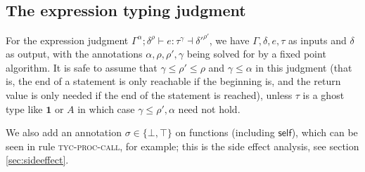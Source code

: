 \documentclass[acmsmall,nonacm]{acmart}
\newcommand{\proves}{\vdash}
\newcommand{\makes}{\dashv}
\begin{document}
\subsection{The expression typing judgment}

For the expression judgment $\Gamma^\alpha;\delta^{\rho} \proves e:\tau^\gamma\makes{\delta'}^{\rho'}$, we have $\Gamma,\delta,e,\tau$ as inputs and $\delta$ as output, with the annotations $\alpha,\rho,\rho',\gamma$ being solved for by a fixed point algorithm. It is safe to assume that $\gamma\le \rho'\le \rho$ and $\gamma\le \alpha$ in this judgment (that is, the end of a statement is only reachable if the beginning is, and the return value is only needed if the end of the statement is reached), unless $\tau$ is a ghost type like $\mathbf{1}$ or $A$ in which case $\gamma\le \rho',\alpha$ need not hold.

We also add an annotation $\sigma\in\{\bot,\top\}$ on functions (including $\mathsf{self}$), which can be seen in rule \textsc{tyc-proc-call}, for example; this is the side effect analysis, see section \ref{sec:sideeffect}.
\end{document}
